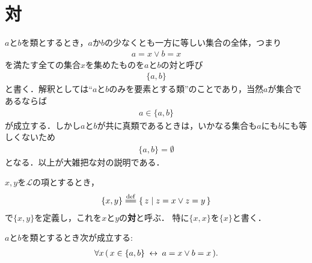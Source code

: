\section{対}
	$a$と$b$を類とするとき，$a$か$b$の少なくとも一方に等しい集合の全体，つまり
	\begin{align}
		a = x \vee b = x
	\end{align}
	を満たす全ての集合$x$を集めたものを$a$と$b$の対と呼び
	\begin{align}
		\{a,b\}
	\end{align}
	と書く．解釈としては``$a$と$b$のみを要素とする類''のことであり，当然$a$が集合であるならば
	\begin{align}
		a \in \{a,b\}
	\end{align}
	が成立する．しかし$a$と$b$が共に真類であるときは，いかなる集合も$a$にも$b$にも等しくないため
	\begin{align}
		\{a,b\} = \emptyset
	\end{align}
	となる．以上が大雑把な対の説明である．
	
	\begin{screen}
		\begin{dfn}[対]
			$x,y$を$\mathcal{L}$の項とするとき，
			\begin{align}
				\{x,y\} \defeq \Set{z}{z = x \vee z = y}
			\end{align}
			で$\{x,y\}$を定義し，これを$x$と$y$の{\bf 対}と呼ぶ．
			特に$\{x,x\}$を$\{x\}$と書く．
		\end{dfn}
	\end{screen}
	
	\begin{screen}
		\begin{thm}[対は表示されている要素しか持たない]
		\label{thm:pair_members_are_exactly_the_given_two}
			$a$と$b$を類とするとき次が成立する:
			\begin{align}
				\forall x\, (\, x \in \{a,b\} \hspace{0.25em}\leftrightarrow\hspace{0.25em} a=x \vee b=x\, ).
			\end{align}
		\end{thm}
	\end{screen}
	
